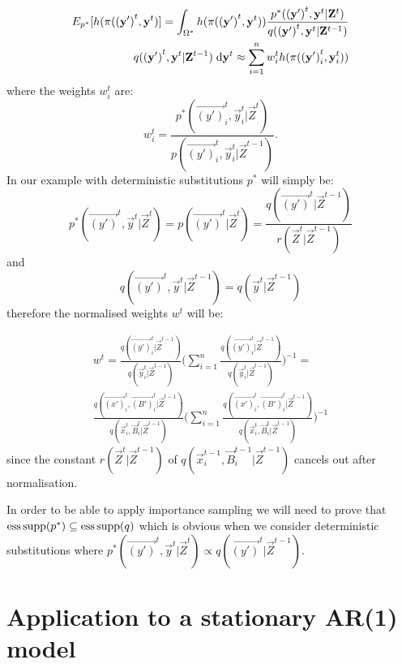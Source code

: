 \begin{align*}
    E_{p^*}[h(\pi (\mathbf{(y')}^{t}, \mathbf{y}^{t})] = \int_{\Omega^*} h(\pi(\mathbf{(y')}^{t}, \mathbf{y}^{t})) \frac{p^*(\mathbf{(y')}^{t}, \mathbf{y}^{t}|\mathbf{Z}^{t})} {q(\mathbf{(y')}^{t}, \mathbf{y}^{t} | \mathbf{Z}^{t-1})} \\
    q(\mathbf{(y')}^{t}, \mathbf{y}^{t} | \mathbf{Z}^{t-1}) \; \mathrm{d} \mathbf{y}^{t} \approx \sum_{i=1}^n  w^{t}_i h(\pi (\mathbf{(y')}^{t}_i, \mathbf{y}^{t}_i))
\end{align*}
where the weights $w^{t}_i$ are:
\begin{equation*}
    w^{t}_i = \frac{p^*(\vec{(y')}^{t}_i, \vec{y}^{t}_i | \vec{Z}^{t})} {p(\vec{(y')}^{t}_i, \vec{y}^{t}_i|\vec{Z}^{t-1})}.
\end{equation*}
In our example with deterministic substitutions $p^*$ will simply be:
\begin{equation*}
    p^*(\vec{(y')}^{t}, \vec{y}^{t} | \vec{Z}^{t}) = p(\vec{(y')}^{t} | \vec{Z}^{t}) = \frac{ q(\vec{(y')}^{t}|\vec{Z}^{t-1})} {r(\vec{Z}^{t} | \vec{Z}^{t-1})}
\end{equation*}
and
\begin{equation*}
    q(\vec{(y')}^{t}, \vec{y}^{t} | \vec{Z}^{t-1}) = q(\vec{y}^{t} | \vec{Z}^{t-1})
\end{equation*}
therefore the normalised weights $w^t$ will be:

\begin{multline*}
    w^{t} = \frac{q(\vec{(y')}^{t}_i | \vec{Z}^{t-1}) }{q(\vec{y}^{t}_i | \vec{Z}^{t-1})}\Bigg( \sum_{i=1}^n  \frac{q(\vec{(y')}^{t}_i | \vec{Z}^{t-1}) }{q(\vec{y}^{t}_i | \vec{Z}^{t-1})}\Bigg)^{-1} = \\
    \frac{q(\vec{(x')}^{t}_i, \vec{(B')}^{t}_i | \vec{Z}^{t-1}) }{q(\vec{x}^{t}_i, \vec{B}^{t}_i | \vec{Z}^{t-1})}\Bigg( \sum_{i=1}^n \frac{q(\vec{(x')}^{t}_i, \vec{(B')}^{t}_i | \vec{Z}^{t-1}) }{q(\vec{x}^{t}_i, \vec{B}^{t}_i | \vec{Z}^{t-1})}\Bigg)^{-1}
\end{multline*}
since the constant $r(\vec{Z}^t | \vec{Z}^{t-1})$ of $q(\vec{x}^{t-1}_i,\vec{B}^{t-1}_i | \vec{Z}^{t-1})$ cancels out after normalisation.

In order to be able to apply importance sampling we will need to prove that $\operatorname{ess\,supp}(p^*) \subseteq \operatorname{ess\,supp}(q)$
which is obvious when we consider deterministic substitutions where $p^*(\vec{(y')}^{t}, \vec{y}^{t} | \vec{Z}^{t}) \propto q(\vec{(y')}^{t}|\vec{Z}^{t-1})$.

\section{Application to a stationary AR(1) model}
\label{sec:3}

